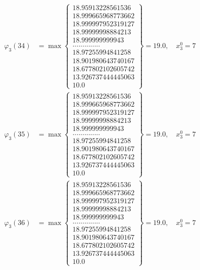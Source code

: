 \documentclass{article}
\begin{document}
\begin{align*}
  
  
  
\varphi_{3}(34) &= \max \left\{ \begin{array}{c}
18.95913228561536 \\
 18.999665968773662 \\
 18.999997952319127 \\
 18.99999998884213 \\
 18.999999999943 \\
 .............. \\
 18.97255994841258 \\
 18.901980643740167 \\
 18.677802102605742 \\
 13.926737444445063 \\
 10.0
\end{array} \right\} = 19.0, \quad x_{3}^0 = 7\\
  
  
  
  
\varphi_{3}(35) &= \max \left\{ \begin{array}{c}
18.95913228561536 \\
 18.999665968773662 \\
 18.999997952319127 \\
 18.99999998884213 \\
 18.999999999943 \\
 .............. \\
 18.97255994841258 \\
 18.901980643740167 \\
 18.677802102605742 \\
 13.926737444445063 \\
 10.0
\end{array} \right\} = 19.0, \quad x_{3}^0 = 7\\
  
  
  
  
\varphi_{3}(36) &= \max \left\{ \begin{array}{c}
18.95913228561536 \\
 18.999665968773662 \\
 18.999997952319127 \\
 18.99999998884213 \\
 18.999999999943 \\
 .............. \\
 18.97255994841258 \\
 18.901980643740167 \\
 18.677802102605742 \\
 13.926737444445063 \\
 10.0
\end{array} \right\} = 19.0, \quad x_{3}^0 = 7\\
  
  
\end{align*}
\end{document}
